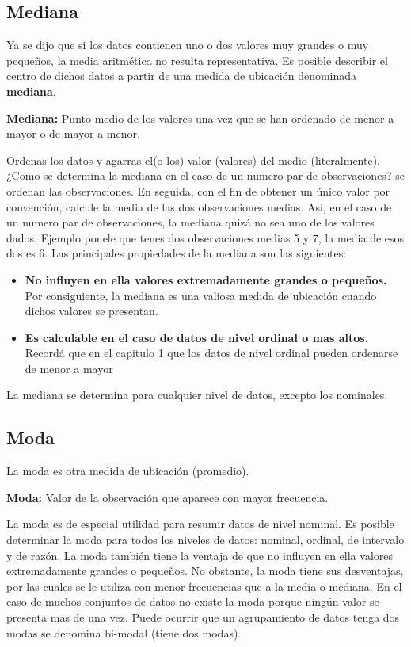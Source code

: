 \documentclass[]{article}
\begin{document}
\subsection{Mediana}
Ya se dijo que si los datos contienen uno o dos valores muy grandes o muy pequeños, la media aritmética no resulta representativa. Es posible describir el centro de dichos datos a partir de una medida de ubicación denominada \textbf{mediana}.
\begin{center}
	\textbf{Mediana: }Punto medio de los valores una vez que se han ordenado de menor a mayor o de mayor a menor.
\end{center}
Ordenas los datos y agarras el(o los) valor (valores) del medio (literalmente). ¿Como se determina la mediana en el caso de un numero par de observaciones? se ordenan las observaciones. En seguida, con el fin de obtener un único valor por convención, calcule la media de las dos observaciones medias. Así, en el caso de un numero par de observaciones, la mediana quizá no sea uno de los valores dados. Ejemplo ponele que tenes dos observaciones medias 5 y 7, la media de esos dos es 6.
Las principales propiedades de la mediana son las siguientes:
\begin{itemize}
	\item \textbf{No influyen en ella valores extremadamente grandes o pequeños.} Por consiguiente, la mediana es una valiosa medida de ubicación cuando dichos valores se presentan.
	\item \textbf{Es calculable en el caso de datos de nivel ordinal o mas altos.} Recordá que en el capitulo 1 que los datos de nivel ordinal pueden ordenarse de menor a mayor
\end{itemize}
La mediana se determina para cualquier nivel de datos, excepto los nominales.

\subsection{Moda}
La moda es otra medida de ubicación (promedio).
\begin{center}
	\textbf{Moda:} Valor de la observación que aparece con mayor frecuencia.
\end{center}
La moda es de especial utilidad para resumir datos de nivel nominal. Es posible determinar la moda para todos los niveles de datos: nominal, ordinal, de intervalo y de razón. La moda también tiene la ventaja de que no influyen en ella valores extremadamente grandes o pequeños. No obstante, la moda tiene sus desventajas, por las cuales se le utiliza con menor frecuencias que a la media o mediana. En el caso de muchos conjuntos de datos no existe la moda porque ningún valor se presenta mas de una vez. Puede ocurrir que un agrupamiento de datos tenga dos modas se denomina bi-modal (tiene dos modas).
\end{document}
